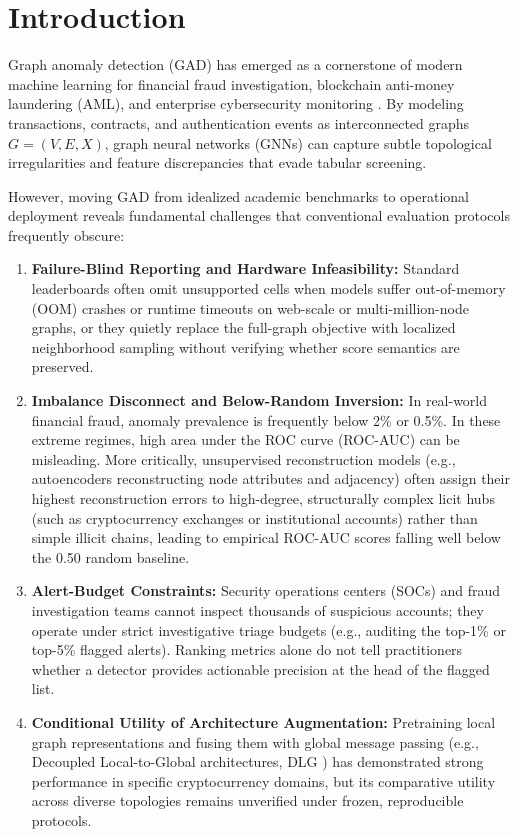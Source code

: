 \documentclass[11pt,a4paper]{article}
\begin{document}
\section{Introduction}
\label{sec:introduction}
Graph anomaly detection (GAD) has emerged as a cornerstone of modern machine learning for financial fraud investigation, blockchain anti-money laundering (AML), and enterprise cybersecurity monitoring \cite{ma2023survey,qiao2025survey}. By modeling transactions, contracts, and authentication events as interconnected graphs $G=(V, E, X)$, graph neural networks (GNNs) can capture subtle topological irregularities and feature discrepancies that evade tabular screening.

However, moving GAD from idealized academic benchmarks to operational deployment reveals fundamental challenges that conventional evaluation protocols frequently obscure:
\begin{enumerate}
    \item \textbf{Failure-Blind Reporting and Hardware Infeasibility:} Standard leaderboards often omit unsupported cells when models suffer out-of-memory (OOM) crashes or runtime timeouts on web-scale or multi-million-node graphs, or they quietly replace the full-graph objective with localized neighborhood sampling without verifying whether score semantics are preserved.
    \item \textbf{Imbalance Disconnect and Below-Random Inversion:} In real-world financial fraud, anomaly prevalence is frequently below 2\% or 0.5\%. In these extreme regimes, high area under the ROC curve (ROC-AUC) can be misleading. More critically, unsupervised reconstruction models (e.g., autoencoders reconstructing node attributes and adjacency) often assign their highest reconstruction errors to high-degree, structurally complex licit hubs (such as cryptocurrency exchanges or institutional accounts) rather than simple illicit chains, leading to empirical ROC-AUC scores falling well below the 0.50 random baseline.
    \item \textbf{Alert-Budget Constraints:} Security operations centers (SOCs) and fraud investigation teams cannot inspect thousands of suspicious accounts; they operate under strict investigative triage budgets (e.g., auditing the top-1\% or top-5\% flagged alerts). Ranking metrics alone do not tell practitioners whether a detector provides actionable precision at the head of the flagged list.
    \item \textbf{Conditional Utility of Architecture Augmentation:} Pretraining local graph representations and fusing them with global message passing (e.g., Decoupled Local-to-Global architectures, DLG \cite{park2026dlg}) has demonstrated strong performance in specific cryptocurrency domains, but its comparative utility across diverse topologies remains unverified under frozen, reproducible protocols.
\end{enumerate}
\end{document}
